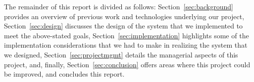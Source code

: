 \documentclass[../main.tex]{subfiles}
\begin{document}
The remainder of this report is divided as follows: Section~\ref{sec:background} provides an overview of previous work and technologies underlying our project,
Section~\ref{sec:design} discusses the design of the system that we implemented to meet the above-stated goals, Section~\ref{sec:implementation} highlights
some of the implementation considerations that we had to make in realizing the system that we designed, Section~\ref{sec:projectmgmt} details the managerial
aspects of this project, and, finally, Section~\ref{sec:conclusion} offers areas where this project could be improved, and concludes this report.

\end{document}
